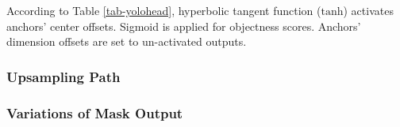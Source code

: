 \documentclass[default,pdflatex,iicol]{sn-jnl}%
\begin{document}
According to Table \ref{tab-yolohead}, hyperbolic tangent function ($\mathrm{tanh}$) activates anchors' center offsets. Sigmoid is applied for objectness scores. Anchors' dimension offsets are set to un-activated outputs.

\begin{table}[]
\centering
\caption{Structure of a YOLO detection branch with the three prior boxes or anchors, where $n$ represents the number of filters, and activation function is denoted by $f(x)$. $w$ and $d$ orderly represents input tensor's spatial size and its depth, which may come from ``res4" or ``res5".}
\label{tab-yolohead}
\end{table}

\subsubsection{Upsampling Path}


\subsubsection{Variations of Mask Output}
\end{document}
